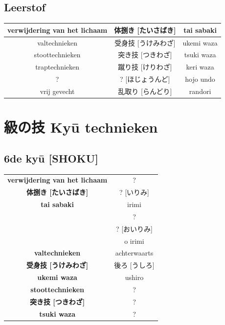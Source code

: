 \documentclass[12pt]{scrartcl}
\begin{document}
\begin{CJK*}{UTF8}{min}
\subsection{Leerstof}
\begin{table}[H]
\begin{center}
\begin{tabular}{c|c|c}
verwijdering van het lichaam & 体捌き [たいさばき] & tai sabaki\\
\hline
valtechnieken & 受身技 [うけみわざ] & ukemi waza\\
\hline
stoottechnieken & 突き技 [つきわざ] & tsuki waza\\
\hline
traptechnieken & 蹴り技 [けりわざ] & keri waza\\
\hline
? & ? [ほじょうんど] & hojo undo\\
\hline
vrij gevecht & 乱取り [らんどり] & randori
\end{tabular}
\end{center}
\end{table}

\newpage
\section{級の技 Ky\={u} technieken}
\subsection{6de ky\={u} [SHOKU]}
\begin{table}[H]
\begin{center}
\begin{tabular}{c|c}
\textbf{verwijdering van het lichaam} & ?\\
\textbf{体捌き [たいさばき]} & ? [いりみ]\\
\textbf{tai sabaki} & irimi\\
\cline{2-2}
& ?\\
& ? [おいりみ]\\
& o irimi\\
\hline
\textbf{valtechnieken} & achterwaarts\\
\textbf{受身技 [うけみわざ]} & 後ろ [うしろ]\\
\textbf{ukemi waza} & ushiro\\
\hline
\textbf{stoottechnieken} & ?\\
\textbf{突き技 [つきわざ]} & ?\\
\textbf{tsuki waza} & ? \\
\hline
\end{tabular}
\end{center}
\label{kyuu_6}
\end{table}


\end{CJK*}
\end{document}
